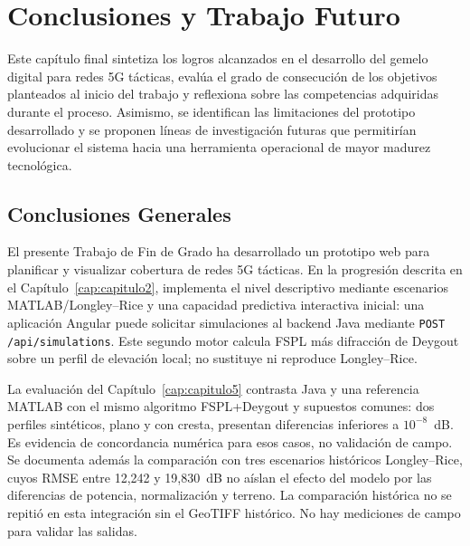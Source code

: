 \chapter{Conclusiones y Trabajo Futuro}
\label{cap:capitulo6}

Este capítulo final sintetiza los logros alcanzados en el desarrollo del gemelo digital para redes 5G tácticas, evalúa el grado de consecución de los objetivos planteados al inicio del trabajo y reflexiona sobre las competencias adquiridas durante el proceso. Asimismo, se identifican las limitaciones del prototipo desarrollado y se proponen líneas de investigación futuras que permitirían evolucionar el sistema hacia una herramienta operacional de mayor madurez tecnológica.

\section{Conclusiones Generales}
\label{sec:conclusiones}

El presente Trabajo de Fin de Grado ha desarrollado un prototipo web para planificar y visualizar cobertura de redes 5G tácticas. En la progresión descrita en el Capítulo~\ref{cap:capitulo2}, implementa el nivel descriptivo mediante escenarios MATLAB/Longley--Rice y una capacidad predictiva interactiva inicial: una aplicación Angular puede solicitar simulaciones al backend Java mediante \texttt{POST /api/simulations}. Este segundo motor calcula FSPL más difracción de Deygout sobre un perfil de elevación local; no sustituye ni reproduce Longley--Rice.

La evaluación del Capítulo~\ref{cap:capitulo5} contrasta Java y una referencia MATLAB
con el mismo algoritmo FSPL+Deygout y supuestos comunes: dos perfiles sintéticos,
plano y con cresta, presentan diferencias inferiores a $10^{-8}$~dB. Es evidencia
de concordancia numérica para esos casos, no validación de campo. Se documenta además
la comparación con tres escenarios históricos Longley--Rice, cuyos RMSE entre 12,242
y 19,830~dB no aíslan el efecto del modelo por las diferencias de potencia,
normalización y terreno. La comparación histórica no se repitió en esta integración
sin el GeoTIFF histórico. No hay mediciones de campo para validar las salidas.

